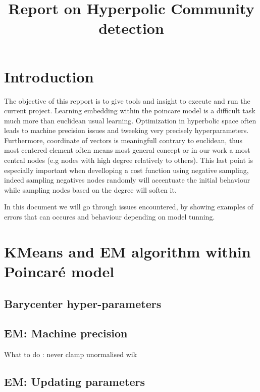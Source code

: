 \documentclass{article}
\title{Report on Hyperpolic Community detection}
\author{}
\begin{document}
    \maketitle
    \section{Introduction}
    The objective of this repport is to give tools and insight to execute and run the current project. Learning embedding within the poincare model is a difficult task much more than euclidean usual learning.
    Optimization in hyperbolic space often leads to machine precision issues and tweeking very precisely hyperparameters.
    Furthermore, coordinate of vectors is meaningfull contrary to euclidean, thus most centered element often means most general concept or in our work a most central nodes (e.g nodes with high degree relatively to others). This last point is especially important when develloping a cost function using negative sampling, indeed sampling negatives nodes randomly will accentuate the initial behaviour while sampling nodes based on the degree will soften it.

    In this document we will go through issues encountered, by showing examples of errors that can occures and behaviour depending on model tunning.


    \section{KMeans and EM algorithm within Poincaré model}
        \subsection{Barycenter hyper-parameters}

        \subsection{EM:  Machine precision}
            What to do : never clamp unormalised wik 
        \newpage
        \subsection{EM: Updating parameters}
\end{document}
